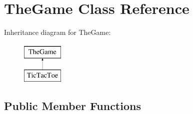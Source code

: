 \hypertarget{class_the_game}{\section{The\+Game Class Reference}
\label{class_the_game}
}
Inheritance diagram for The\+Game\+:\begin{figure}[H]
\begin{center}
\leavevmode
\includegraphics[height=2.000000cm]{class_the_game}
\end{center}
\end{figure}
\subsection*{Public Member Functions}
